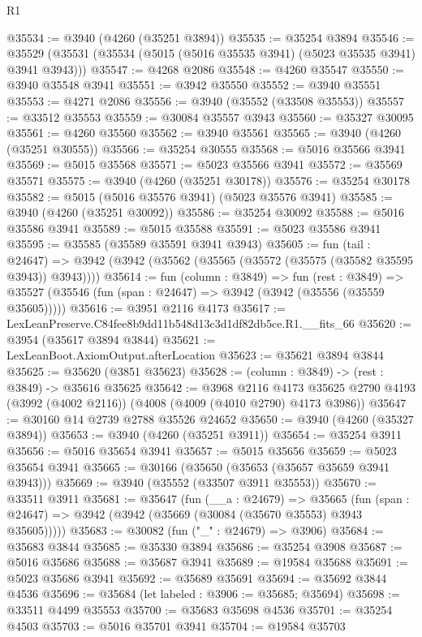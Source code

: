 \begin{lexlean}{R1}
\begin{coremodule}
@35534 := @3940 (@4260 (@35251 @3894))
@35535 := @35254 @3894
@35546 := @35529 (@35531 (@35534 (@5015 (@5016 @35535 @3941) (@5023 @35535 @3941) @3941 @3943)))
@35547 := @4268 @2086
@35548 := @4260 @35547
@35550 := @3940 @35548 @3941
@35551 := @3942 @35550
@35552 := @3940 @35551
@35553 := @4271 @2086
@35556 := @3940 (@35552 (@33508 @35553))
@35557 := @33512 @35553
@35559 := @30084 @35557 @3943
@35560 := @35327 @30095
@35561 := @4260 @35560
@35562 := @3940 @35561
@35565 := @3940 (@4260 (@35251 @30555))
@35566 := @35254 @30555
@35568 := @5016 @35566 @3941
@35569 := @5015 @35568
@35571 := @5023 @35566 @3941
@35572 := @35569 @35571
@35575 := @3940 (@4260 (@35251 @30178))
@35576 := @35254 @30178
@35582 := @5015 (@5016 @35576 @3941) (@5023 @35576 @3941)
@35585 := @3940 (@4260 (@35251 @30092))
@35586 := @35254 @30092
@35588 := @5016 @35586 @3941
@35589 := @5015 @35588
@35591 := @5023 @35586 @3941
@35595 := @35585 (@35589 @35591 @3941 @3943)
@35605 := fun (tail : @24647) =>
  @3942 (@3942 (@35562 (@35565 (@35572 (@35575 (@35582 @35595 @3943)) @3943))))
@35614 := fun (column : @3849) =>
  fun (rest : @3849) =>
  @35527 (@35546 (fun (span : @24647) => @3942 (@3942 (@35556 (@35559 @35605)))))
@35616 := @3951 @2116 @4173
@35617 := LexLeanPreserve.C84fee8b9dd11b548d13c3d1df82db5ce.R1.__fits_66
@35620 := @3954 (@35617 @3894 @3844)
@35621 := LexLeanBoot.AxiomOutput.afterLocation
@35623 := @35621 @3894 @3844
@35625 := @35620 (@3851 @35623)
@35628 := (column : @3849) -> (rest : @3849) -> @35616 @35625
@35642 := @3968
    @2116
    @4173
    @35625
    @2790
    @4193
    (@3992 (@4002 @2116))
    (@4008 (@4009 (@4010 @2790) @4173 @3986))
@35647 := @30160 @14 @2739 @2788 @35526 @24652
@35650 := @3940 (@4260 (@35327 @3894))
@35653 := @3940 (@4260 (@35251 @3911))
@35654 := @35254 @3911
@35656 := @5016 @35654 @3941
@35657 := @5015 @35656
@35659 := @5023 @35654 @3941
@35665 := @30166 (@35650 (@35653 (@35657 @35659 @3941 @3943)))
@35669 := @3940 (@35552 (@33507 @3911 @35553))
@35670 := @33511 @3911
@35681 := @35647
    (fun (__a : @24679) =>
    @35665 (fun (span : @24647) => @3942 (@3942 (@35669 (@30084 (@35670 @35553) @3943 @35605)))))
@35683 := @30082 (fun ("_" : @24679) => @3906)
@35684 := @35683 @3844
@35685 := @35330 @3894
@35686 := @35254 @3908
@35687 := @5016 @35686
@35688 := @35687 @3941
@35689 := @19584 @35688
@35691 := @5023 @35686 @3941
@35692 := @35689 @35691
@35694 := @35692 @3844 @4536
@35696 := @35684 (let labeled : @3906 := @35685; @35694)
@35698 := @33511 @4499 @35553
@35700 := @35683 @35698 @4536
@35701 := @35254 @4503
@35703 := @5016 @35701 @3941
@35704 := @19584 @35703

\end{coremodule}
\end{lexlean}
